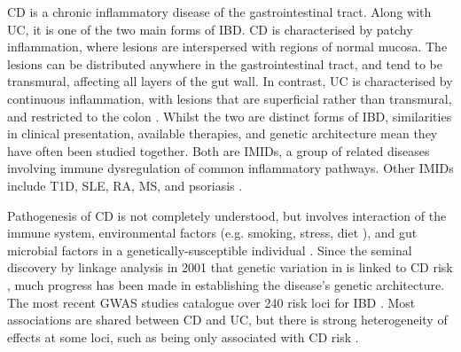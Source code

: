 \gls{CD} is a chronic inflammatory disease of the gastrointestinal tract.
Along with \gls{UC}, it is one of the two main forms of \gls{IBD}.
\gls{CD} is characterised by patchy inflammation, where lesions are interspersed with regions of normal mucosa. 
The lesions can be distributed anywhere in the gastrointestinal tract, and tend to be transmural, affecting all layers of the gut wall.
In contrast, \gls{UC} is characterised by continuous inflammation, with lesions that are superficial rather than transmural, and restricted to the colon \autocite{roda2020CrohnDisease}.
Whilst the two are distinct forms of \gls{IBD}, similarities in clinical presentation, available therapies, and genetic architecture mean they have often been studied together.
Both are \glspl{IMID}, a group of related diseases involving immune dysregulation of common inflammatory pathways.
Other \glspl{IMID} include \gls{T1D}, \gls{SLE}, \gls{RA}, \gls{MS}, and psoriasis \autocite{cotsapas2013ImmunemediatedDiseaseGenetics,david2018GeneticsImmunemediatedInflammatory}.

Pathogenesis of \gls{CD} is not completely understood, but involves interaction of the immune system, environmental factors (e.g. smoking, stress, diet \autocite{ananthakrishnan2015EpidemiologyRiskFactors,roda2020CrohnDisease}), and gut microbial factors in a genetically-susceptible individual \autocite{desouza2016ImmunopathogenesisIBDCurrent}.
Since the seminal discovery by linkage analysis in 2001 that genetic variation in  is linked to \gls{CD} risk \autocite{todd2001TacklingCommonDisease},
much progress has been made in establishing the disease's genetic architecture.
The most recent \gls{GWAS} studies catalogue over 240 risk loci for \gls{IBD} \autocite{delange2017GenomewideAssociationStudy}.
Most associations are shared between \gls{CD} and \gls{UC}, but there is strong heterogeneity of effects at some loci, such as  being only associated with \gls{CD} risk \autocite{jostins2012HostMicrobeInteractions,liu2015AssociationAnalysesIdentify}.


